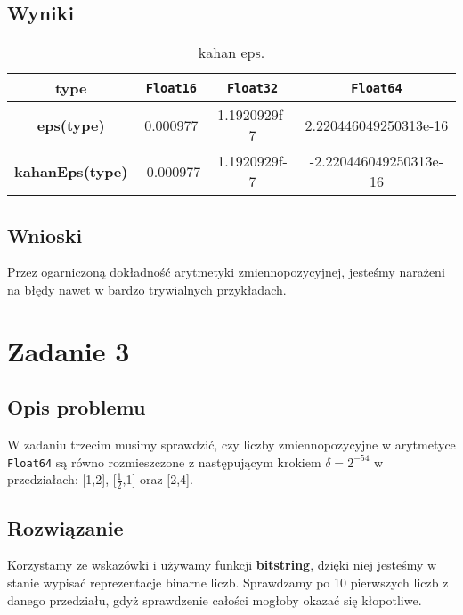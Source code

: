 \documentclass{article}
\begin{document}
\begin{center}
    \subsection{Wyniki}
     \begin{table}[h!]
     \centering
     \begin{tabular}{||c c c c||} 
     \hline
     \textbf{type} & \texttt{Float16} & \texttt{Float32} & \texttt{Float64} \\ [0.5ex]
     \hline\hline
     \textbf{eps(type)} & 0.000977 & 1.1920929f-7 & 2.220446049250313e-16  \\ 
     \textbf{kahanEps(type)} & -0.000977 & 1.1920929f-7 & -2.220446049250313e-16 \\
     \hline
     \end{tabular}
     \caption{kahan eps.}
     \label{table:5}
     \end{table}
    
    \subsection{Wnioski}
    \large Przez ogarniczoną dokładność arytmetyki zmiennopozycyjnej, jesteśmy narażeni na błędy nawet w bardzo trywialnych przykładach.
    \section{Zadanie 3}
    \subsection{Opis problemu}
    \large W zadaniu trzecim musimy sprawdzić, czy liczby zmiennopozycyjne w arytmetyce \texttt{Float64} są równo
     rozmieszczone z następującym krokiem \(\delta = 2^{-54}\) w przedziałach: [1,2], [\(\frac{1}{2}\),1] oraz [2,4].
    \subsection{Rozwiązanie}
     \large Korzystamy ze wskazówki i używamy funkcji \textbf{bitstring}, dzięki niej jesteśmy w stanie wypisać reprezentacje binarne liczb.
      Sprawdzamy po 10 pierwszych liczb z danego przedziału, gdyż sprawdzenie całości mogłoby okazać się kłopotliwe.

\end{center}
\end{document}
